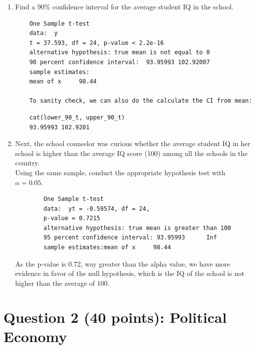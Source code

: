 \documentclass[12pt,letterpaper]{article}
\begin{document}
\begin{enumerate}
	\item Find a 90\% confidence interval for the average student IQ in the school.\\
	  
	
	\begin{verbatim}
	One Sample t-test
	data:  y
	t = 37.593, df = 24, p-value < 2.2e-16
	alternative hypothesis: true mean is not equal to 0
	90 percent confidence interval:  93.95993 102.92007
	sample estimates:
	mean of x     98.44 	
	
	To sanity check, we can also do the calculate the CI from mean:

	\end{verbatim}
	  
	\begin{verbatim}
	cat(lower_90_t, upper_90_t)
	93.95993 102.9201
	\end{verbatim}
	\vspace{.5cm}
	
	
	\item Next, the school counselor was curious  whether  the average student IQ in her school is higher than the average IQ score (100) among all the schools in the country.\\ 

	\noindent Using the same sample, conduct the appropriate hypothesis test with $\alpha=0.05$.
	
		  
	\begin{verbatim}
		One Sample t-test
		data:  yt = -0.59574, df = 24, 
		p-value = 0.7215
		alternative hypothesis: true mean is greater than 100
		95 percent confidence interval: 93.95993      Inf
		sample estimates:mean of x     98.44 
	\end{verbatim}
	\noindent As the p-value is 0.72, way greater than the alpha value, we have more evidence in favor of the null hypothesis, which is the IQ of the school is not higher than the average of 100. 

\end{enumerate}

\newpage

	\section*{Question 2 (40 points): Political Economy}
\end{document}

